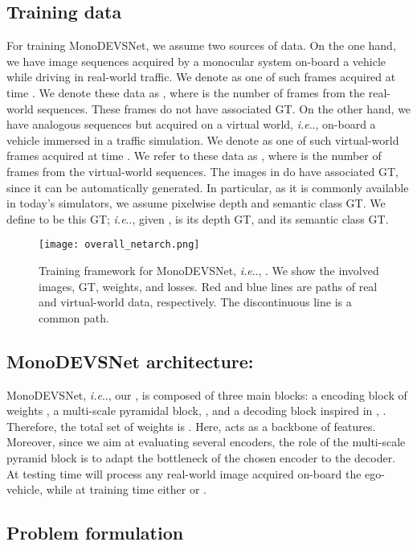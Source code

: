 \documentclass[journal]{IEEEtran}
\makeatletter
\DeclareRobustCommand\onedot{\futurelet\@let@token\@onedot}
\def\@onedot{\ifx\@let@token.\else.\null\fi\xspace}
\def\ie{\emph{i.e}\onedot} \def\Ie{\emph{I.e}\onedot}
\makeatother
\begin{document}
\subsection{Training data}
\label{ssec:trainingdata}
For training MonoDEVSNet, we assume two sources of  data. On the one hand, we have image sequences acquired by a monocular system on-board a vehicle while driving in real-world traffic. We denote as  one of such frames acquired at time . We denote these data as , where  is the number of frames from the real-world sequences. These frames do not have associated GT. On the other hand, we have analogous sequences but acquired on a virtual world, {\ie}, on-board a vehicle immersed in a traffic simulation. We denote as  one of such virtual-world frames acquired at time . We refer to these data as , where  is the number of frames from the virtual-world sequences. The images in  do have associated GT, since it can be automatically generated. In particular, as it is commonly available in today's simulators, we assume pixelwise depth and semantic class GT. We define  to be this GT; {\ie}, given ,  is its depth GT, and  its semantic class GT. 

\begin{figure}
    \centering
    \texttt{[image: overall\_netarch.png]}
    \caption{Training framework for MonoDEVSNet, {\ie}, . We show the involved images, GT, weights, and losses. Red and blue lines are paths of real and virtual-world data, respectively. The discontinuous line is a common path. 
    }
    \label{fig:overall_training}
\end{figure}

 
\subsection{MonoDEVSNet architecture: }
\label{ssec:MDECNN}

MonoDEVSNet, {\ie}, our , is composed of three main blocks: a encoding block of weights , a multi-scale pyramidal block, , and a decoding block inspired in \cite{Godard:2019MonoDepth2}, . Therefore, the total set of weights is . Here,  acts as a backbone of features. Moreover, since we aim at evaluating several encoders, the role of the multi-scale pyramid block is to adapt the bottleneck of the chosen encoder to the decoder. At testing time  will process any real-world image  acquired on-board the ego-vehicle, while at training time either  or .

\subsection{Problem formulation}
\label{ssec:formulation}
\end{document}
